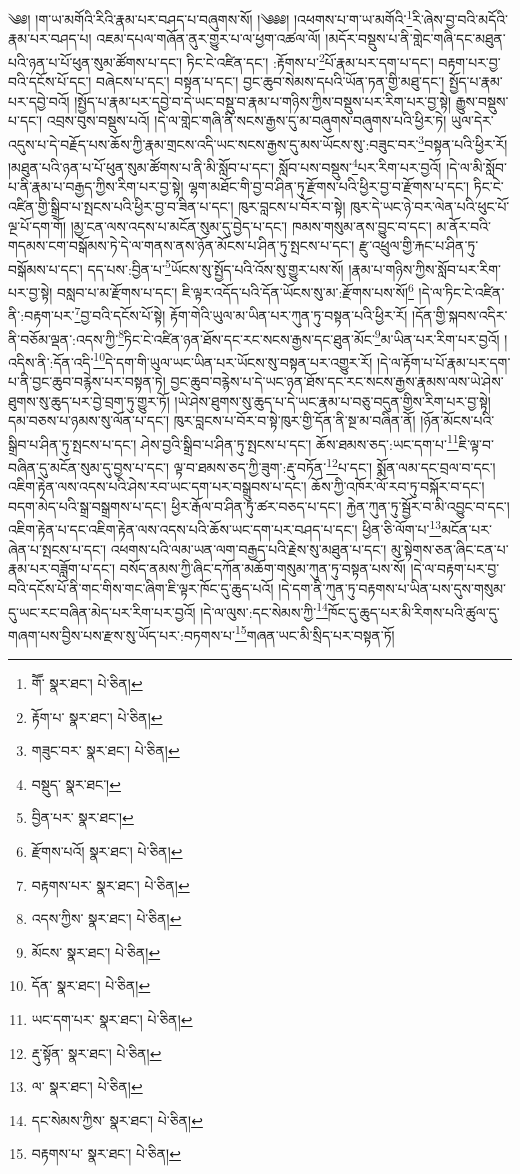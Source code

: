 \setcounter{footnote}{0} 
༄༅། །ག་ཡ་མགོའི་རིའི་རྣམ་པར་བཤད་པ་བཞུགས་སོ། །༄༅༅། །འཕགས་པ་ག་ཡ་མགོའི་\footnote{གཽ་  སྣར་ཐང་།  པེ་ཅིན། }རི་ཞེས་བྱ་བའི་མདོའི་རྣམ་པར་བཤད་པ། འཇམ་དཔལ་གཞོན་ནུར་གྱུར་པ་ལ་ཕྱག་འཚལ་ལོ། །མདོར་བསྡུས་པ་ནི་གླེང་གཞི་དང་མཐུན་པའི་ཉན་པ་པོ་ཕུན་སུམ་ཚོགས་པ་དང་། ཏིང་ངེ་འཛིན་དང་། :རྟོགས་པ་\footnote{རྟོག་པ་  སྣར་ཐང་།  པེ་ཅིན། }པོ་རྣམ་པར་དག་པ་དང་། བརྟག་པར་བྱ་བའི་དངོས་པོ་དང་། བཞེངས་པ་དང་། བསྟན་པ་དང་། བྱང་ཆུབ་སེམས་དཔའི་ཡོན་ཏན་གྱི་མཐུ་དང་། སྤྱོད་པ་རྣམ་པར་དབྱེ་བའོ། །སྤྱོད་པ་རྣམ་པར་དབྱེ་བ་དེ་ཡང་བསྡུ་བ་རྣམ་པ་གཉིས་ཀྱིས་བསྡུས་པར་རིག་པར་བྱ་སྟེ། རྒྱུས་བསྡུས་པ་དང་། འབྲས་བུས་བསྡུས་པའོ། །དེ་ལ་གླེང་གཞི་ནི་སངས་རྒྱས་དུ་མ་བཞུགས་བཞུགས་པའི་ཕྱིར་ཏེ། ཡུལ་དེར་འདུས་པ་དེ་བརྗོད་པས་ཆོས་ཀྱི་རྣམ་གྲངས་འདི་ཡང་སངས་རྒྱས་དུ་མས་ཡོངས་སུ་:བཟུང་བར་\footnote{གཟུང་བར་  སྣར་ཐང་།  པེ་ཅིན། }བསྟན་པའི་ཕྱིར་རོ། །མཐུན་པའི་ཉན་པ་པོ་ཕུན་སུམ་ཚོགས་པ་ནི་མི་སློབ་པ་དང་། སློབ་པས་བསྡུས་\footnote{བསྡུད་  སྣར་ཐང་། }པར་རིག་པར་བྱའོ། །དེ་ལ་མི་སློབ་པ་ནི་རྣམ་པ་བརྒྱད་ཀྱིས་རིག་པར་བྱ་སྟེ། ལྷག་མཐོང་གི་བྱ་བ་ཤིན་ཏུ་རྫོགས་པའི་ཕྱིར་བྱ་བ་རྫོགས་པ་དང་། ཏིང་ངེ་འཛིན་གྱི་སྒྲིབ་པ་སྤངས་པའི་ཕྱིར་བྱ་བ་ཟིན་པ་དང་། ཁུར་བླངས་པ་བོར་བ་སྟེ། ཁུར་དེ་ཡང་ཉེ་བར་ལེན་པའི་ཕུང་པོ་ལྔ་པོ་དག་གོ། །མྱ་ངན་ལས་འདས་པ་མངོན་སུམ་དུ་བྱེད་པ་དང་། ཁམས་གསུམ་ནས་བྱུང་བ་དང་། མ་ནོར་བའི་གདམས་ངག་བསྒོམས་ཏེ་དེ་ལ་གནས་ནས་ཉོན་མོངས་པ་ཤིན་ཏུ་སྤངས་པ་དང་། རྫུ་འཕྲུལ་གྱི་རྐང་པ་ཤིན་ཏུ་བསྒོམས་པ་དང་། དད་པས་:བྱིན་པ་\footnote{བྱིན་པར་  སྣར་ཐང་། }ཡོངས་སུ་སྤྱོད་པའི་འོས་སུ་གྱུར་པས་སོ། །རྣམ་པ་གཉིས་ཀྱིས་སློབ་པར་རིག་པར་བྱ་སྟེ། བསླབ་པ་མ་རྫོགས་པ་དང་། ཇི་ལྟར་འདོད་པའི་དོན་ཡོངས་སུ་མ་:རྫོགས་པས་སོ།\footnote{རྫོགས་པའོ།  སྣར་ཐང་།  པེ་ཅིན། } །དེ་ལ་ཏིང་ངེ་འཛིན་ནི་:བརྟག་པར་\footnote{བརྟགས་པར་  སྣར་ཐང་།  པེ་ཅིན། }བྱ་བའི་དངོས་པོ་སྟེ། རྟོག་གེའི་ཡུལ་མ་ཡིན་པར་ཀུན་ཏུ་བསྟན་པའི་ཕྱིར་རོ། །དོན་གྱི་སྐབས་འདིར་ནི་བཅོམ་ལྡན་:འདས་ཀྱི་\footnote{འདས་ཀྱིས་  སྣར་ཐང་།  པེ་ཅིན། }ཏིང་ངེ་འཛིན་ཉན་ཐོས་དང་རང་སངས་རྒྱས་དང་ཐུན་མོང་\footnote{མོངས་  སྣར་ཐང་།  པེ་ཅིན། }མ་ཡིན་པར་རིག་པར་བྱའོ། །འདིས་ནི་:དོན་འདི་\footnote{དོན་  སྣར་ཐང་།  པེ་ཅིན། }དེ་དག་གི་ཡུལ་ཡང་ཡིན་པར་ཡོངས་སུ་བསྟན་པར་འགྱུར་རོ། །དེ་ལ་རྟོག་པ་པོ་རྣམ་པར་དག་པ་ནི་བྱང་ཆུབ་བརྙེས་པར་བསྟན་ཏེ། བྱང་ཆུབ་བརྙེས་པ་དེ་ཡང་ཉན་ཐོས་དང་རང་སངས་རྒྱས་རྣམས་ལས་ཡེ་ཤེས་ཐུགས་སུ་ཆུད་པར་བྱེ་བྲག་ཏུ་གྱུར་ཏོ། །ཡེ་ཤེས་ཐུགས་སུ་ཆུད་པ་དེ་ཡང་རྣམ་པ་བཅུ་བདུན་གྱིས་རིག་པར་བྱ་སྟེ། དམ་བཅས་པ་ཉམས་སུ་ལོན་པ་དང་། ཁུར་བླངས་པ་བོར་བ་སྟེ་ཁུར་གྱི་དོན་ནི་སྔ་མ་བཞིན་ནོ། །ཉོན་མོངས་པའི་སྒྲིབ་པ་ཤིན་ཏུ་སྤངས་པ་དང་། ཤེས་བྱའི་སྒྲིབ་པ་ཤིན་ཏུ་སྤངས་པ་དང་། ཆོས་ཐམས་ཅད་:ཡང་དག་པ་\footnote{ཡང་དག་པར་  སྣར་ཐང་།  པེ་ཅིན། }ཇི་ལྟ་བ་བཞིན་དུ་མངོན་སུམ་དུ་བྱས་པ་དང་། ལྟ་བ་ཐམས་ཅད་ཀྱི་ཟུག་:རྡུ་བཏོན་\footnote{རྡུ་སྟོན་  སྣར་ཐང་།  པེ་ཅིན། }པ་དང་། སྨོན་ལམ་དང་བྲལ་བ་དང་། འཇིག་རྟེན་ལས་འདས་པའི་ཤེས་རབ་ཡང་དག་པར་བསྒྲུབས་པ་དང་། ཆོས་ཀྱི་འཁོར་ལོ་རབ་ཏུ་བསྐོར་བ་དང་། བདག་མེད་པའི་སྒྲ་བསྒྲགས་པ་དང་། ཕྱིར་རྒོལ་བ་ཤིན་ཏུ་ཚར་བཅད་པ་དང་། རྐྱེན་ཀུན་ཏུ་སྦྱོར་བ་མི་འབྱུང་བ་དང་། འཇིག་རྟེན་པ་དང་འཇིག་རྟེན་ལས་འདས་པའི་ཆོས་ཡང་དག་པར་བཤད་པ་དང་། ཕྱིན་ཅི་ལོག་པ་\footnote{ལ་  སྣར་ཐང་།  པེ་ཅིན། }མངོན་པར་ཞེན་པ་སྤངས་པ་དང་། འཕགས་པའི་ལམ་ཡན་ལག་བརྒྱད་པའི་རྗེས་སུ་མཐུན་པ་དང་། མུ་སྟེགས་ཅན་ཞིང་ངན་པ་རྣམ་པར་བཟློག་པ་དང་། བསོད་ནམས་ཀྱི་ཞིང་དཀོན་མཆོག་གསུམ་ཀུན་ཏུ་བསྟན་པས་སོ། །དེ་ལ་བརྟག་པར་བྱ་བའི་དངོས་པོ་ནི་གང་གིས་གང་ཞིག་ཇི་ལྟར་ཁོང་དུ་ཆུད་པའོ། །དེ་དག་ནི་ཀུན་ཏུ་བརྟགས་པ་ཡིན་པས་དུས་གསུམ་དུ་ཡང་རང་བཞིན་མེད་པར་རིག་པར་བྱའོ། །དེ་ལ་ལུས་:དང་སེམས་ཀྱི་\footnote{དང་སེམས་ཀྱིས་  སྣར་ཐང་།  པེ་ཅིན། }ཁོང་དུ་ཆུད་པར་མི་རིགས་པའི་ཚུལ་དུ་གཞག་པས་བྱིས་པས་རྫས་སུ་ཡོད་པར་:བཏགས་པ་\footnote{བརྟགས་པ་  སྣར་ཐང་།  པེ་ཅིན། }གཞན་ཡང་མི་སྲིད་པར་བསྟན་ཏོ། 